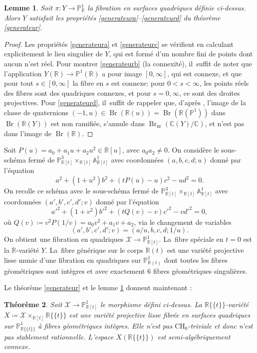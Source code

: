 \documentclass[JEP,XML,SOM,Unicode,francais,published]{cedram}
\newcommand{\CH}{\mathrm{CH}}
\newtheorem{thm}{Théorème}[section]
\newtheorem{lemma}[thm]{Lemme}
\theoremstyle{definition}
\newcommand{\C}{\mathbb C}
\newcommand{\R}{\mathbb R}
\newcommand{\A}{\mathbb A}
\renewcommand{\P}{\mathbb P}
\newcommand{\Br}{\operatorname{Br}}
\newcommand{\mc}[1]{\mathcal{#1}}
\newcommand{\on}[1]{\operatorname{#1}}
\newcommand{\puiseux}{\mathbb{R}\{\!\{t\}\!\}}
\begin{document}
\begin{lemma}\label{refX}
Soit $\pi \colon Y \to \P^1_{\R}$ la fibration en surfaces quadriques définie ci-dessus. Alors $Y$ satisfait les propriétés \eqref{generateura}--\eqref{generateurd} du théorème \ref{generateur}.
\end{lemma}
\begin{proof}
Les propriétés \eqref{generateura} et \eqref{generateurc} se vérifient en calculant explicitement le lieu singulier de $Y$, qui est formé d'un nombre fini de points dont aucun n'est réel. Pour montrer \eqref{generateurb} (la connexité), il~suffit de noter que l'application $Y(\R) \to \P^1(\R)$ a pour image $[0,\infty]$, qui est connexe, et que pour tout $s\in [0,\infty]$ la fibre en $s$ est connexe: pour $0<s<\infty$, les points réels des fibres sont des quadriques connexes, et pour $s=0,\infty$, ce sont des droites projectives. Pour \eqref{generateurd}, il~suffit de rappeler que, d'après \cite[Prop.\,13.1]{colliot2024certaines}, l'image de la classe de quaternions $(-1,u) \in \Br(\R(u))=\Br(\R(\P^1))$ dans $\Br(\R(Y))$ est non ramifiée, s'annule dans $\Br_{\on{nr}}(\C(Y)/\C)$, et n'est pas dans l'image de $\Br(\R)$.
\end{proof}

Soit $P(u)=a_0 + a_1u + a_2 u^2 \in \R[u]$, avec $a_0a_2\neq 0$.
On considère le sous-schéma fermé de $\P^3_{\R[t]} \times_{\R[t]} \A^1_{\R[t]}$ avec coordonnées $(a,b,c,d;u)$ donné par l'équation
\[a^2+(1+u^2)b^2 + (tP(u)- u)c^2 -ud^2=0.\]
On recolle ce schéma avec le sous-schéma fermé de $\P^3_{\R[t]} \times_{\R[t]} \A^1_{\R[t]}$ avec coordonnées $(a',b',c',d';v)$
donné par l'équation
\[a'^2+(1+v^2)b'^2 + (tQ(v)-v)c'^2 -vd'^2=0,\]
où $Q(v)\coloneqq v^2P(1/v)= a_0v^2 + a_1v + a_2$, via le changement de variables
\[(a',b',c',d';v)=(a/u, b, c, d; 1/u).\]
On obtient une fibration en quadriques $\mc{X} \to \P^1_{\R[t]}$. La~fibre spéciale en $t=0$ est la $\R$-variété $Y$. La~fibre générique sur le corps $\R(t)$
est une variété projective lisse munie d'une fibration en quadriques sur $\P^1_{\R(t)}$ dont toutes les fibres géométriques sont intègres et avec exactement $6$ fibres géométriques singulières.

Le théorème \ref{generateur} et le lemme \ref{refX} donnent maintenant :
\begin{thm}\label{prop-fibre-quadriques}
Soit $\mc{X}\to \P^1_{\R[t]}$ le morphisme défini ci-dessus.
La $\puiseux$-variété $X\coloneqq \mc{X}\times_{\R[t]} \puiseux$ est une variété projective lisse fibrée en surfaces quadriques sur $\P^1_{\puiseux}$ à fibres géométriques intègres. Elle n'est pas $\CH_0$-triviale et donc n'est pas stablement rationnelle. L'espace $X(\puiseux)$ est semi-algébriquement connexe.
\end{thm}
\end{document}
